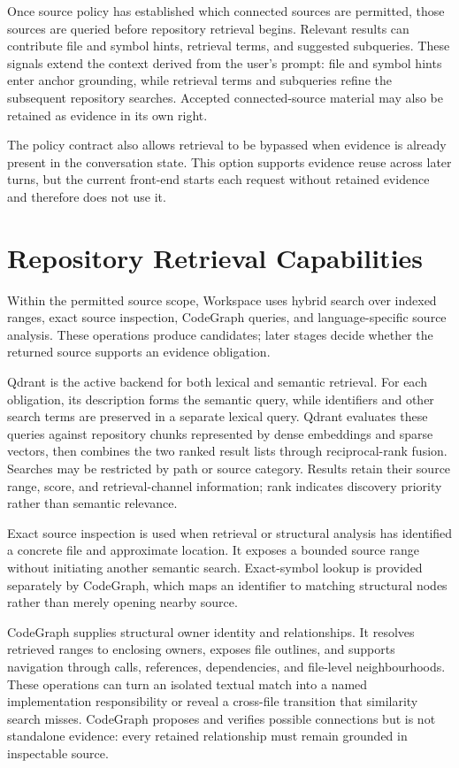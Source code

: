 Once source policy has established which connected sources are permitted, those sources are queried before repository retrieval begins. Relevant results can contribute file and symbol hints, retrieval terms, and suggested subqueries. These signals extend the context derived from the user's prompt: file and symbol hints enter anchor grounding, while retrieval terms and subqueries refine the subsequent repository searches. Accepted connected-source material may also be retained as evidence in its own right.

The policy contract also allows retrieval to be bypassed when evidence is already present in the conversation state. This option supports evidence reuse across later turns, but the current front-end starts each request without retained evidence and therefore does not use it.

\section{Repository Retrieval Capabilities}\label{sec:repository-retrieval-capabilities}

Within the permitted source scope, Workspace uses hybrid search over indexed ranges, exact source inspection, CodeGraph queries, and language-specific source analysis. These operations produce candidates; later stages decide whether the returned source supports an evidence obligation.

Qdrant is the active backend for both lexical and semantic retrieval. For each obligation, its description forms the semantic query, while identifiers and other search terms are preserved in a separate lexical query. Qdrant evaluates these queries against repository chunks represented by dense embeddings and sparse vectors, then combines the two ranked result lists through reciprocal-rank fusion. Searches may be restricted by path or source category. Results retain their source range, score, and retrieval-channel information; rank indicates discovery priority rather than semantic relevance.

Exact source inspection is used when retrieval or structural analysis has identified a concrete file and approximate location. It exposes a bounded source range without initiating another semantic search. Exact-symbol lookup is provided separately by CodeGraph, which maps an identifier to matching structural nodes rather than merely opening nearby source.

CodeGraph supplies structural owner identity and relationships. It resolves retrieved ranges to enclosing owners, exposes file outlines, and supports navigation through calls, references, dependencies, and file-level neighbourhoods. These operations can turn an isolated textual match into a named implementation responsibility or reveal a cross-file transition that similarity search misses. CodeGraph proposes and verifies possible connections but is not standalone evidence: every retained relationship must remain grounded in inspectable source.

